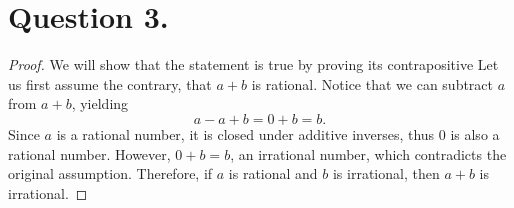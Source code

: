 \documentclass{article}
\begin{document}
\section*{Question 3.}
\begin{proof}
    We will show that the statement  is true by proving its contrapositive  Let us first assume the contrary, that $ a + b $ is rational. Notice that we can subtract $ a $ from $ a + b $, yielding
    \[
        a - a + b = 0 + b = b.
    \]
    Since $ a $ is a rational number, it is closed under additive inverses, thus $ 0 $ is also a rational number. However, $ 0 + b = b $, an irrational number, which contradicts the original assumption. Therefore, if $ a $ is rational and $ b $ is irrational, then $ a + b $ is irrational.
\end{proof}
\end{document}
